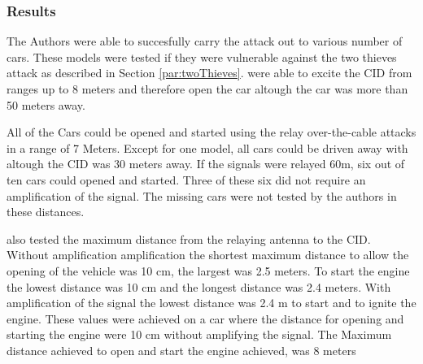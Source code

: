 \subsubsection*{Results}
	The Authors were able to succesfully carry the attack out to various number of cars.
	These models were tested if they were vulnerable against the two thieves attack as described in 
	Section \ref{par:twoThieves}.
	\citeauthor{relayAttacksFranc} were able to excite the CID from ranges up to 8 meters
	and therefore open the car altough the car was more than 50 meters away.

	All of the Cars could be opened and started using the relay over-the-cable attacks in a range of 7 Meters.
	Except for one model,
	all cars could be driven away with altough the CID was 30 meters away.
	If the signals were relayed 60m,
	six out of ten cars could opened and started.
	Three of these six did not require an amplification of the signal.
	The missing cars were not tested by the authors in these distances.

	\citeauthor{relayAttacks} also tested the maximum distance from the relaying antenna to the CID.
	Without amplification amplification the shortest maximum distance to allow the opening of the vehicle was 10 cm,
	the largest was 2.5 meters.
	To start the engine the lowest distance was 10 cm and the longest distance was 2.4 meters.
	With amplification of the signal the lowest distance was 2.4 m to start and to ignite the engine.
	These values were achieved on a car where the distance for opening and starting the engine were 10 cm
	without amplifying the signal.
	The Maximum distance achieved to open and start the engine achieved,
	was 8 meters
	
